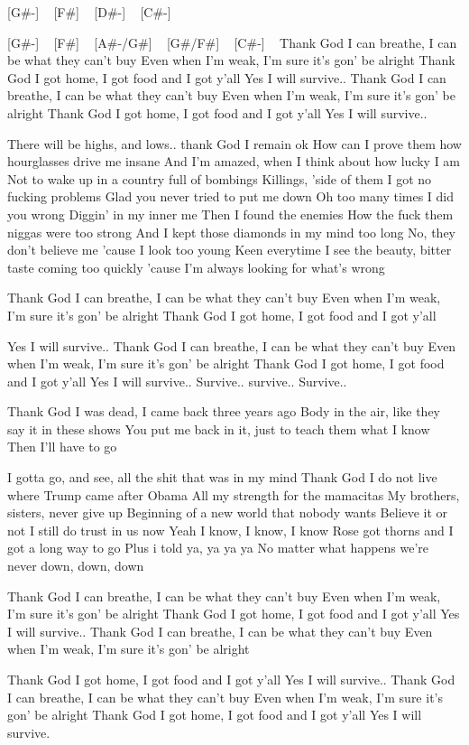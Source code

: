 

[G#-] ~ [F#] ~ [D#-] ~ [C#-] ~

[G#-] ~ [F#] ~ [A#-/G#]  ~ [G#/F#] ~ [C#-] ~
Thank God I can breathe, I can be what they can't buy
Even when I'm weak, I'm sure it's gon' be alright
Thank God I got home, I got food and I got y'all
Yes I will survive..
Thank God I can breathe, I can be what they can't buy
Even when I'm weak, I'm sure it's gon' be alright
Thank God I got home, I got food and I got y'all
Yes I will survive..

There will be highs, and lows.. thank God I remain ok
How can I prove them how hourglasses drive me insane
And I'm amazed, when I think about how lucky I am
Not to wake up in a country full of bombings
Killings, 'side of them I got no fucking problems
Glad you never tried to put me down
Oh too many times I did you wrong
Diggin' in my inner me
Then I found the enemies
How the fuck them niggas were too strong
And I kept those diamonds in my mind too long
No, they don't believe me 'cause I look too young
Keen everytime I see the beauty, bitter taste coming too quickly 'cause
I'm always looking for what's wrong

Thank God I can breathe, I can be what they can't buy
Even when I'm weak, I'm sure it's gon' be alright
Thank God I got home, I got food and I got y'all

Yes I will survive..
Thank God I can breathe, I can be what they can't buy
Even when I'm weak, I'm sure it's gon' be alright
Thank God I got home, I got food and I got y'all
Yes I will survive..
Survive.. survive..
Survive..

Thank God I was dead, I came back three years ago
Body in the air, like they say it in these shows
You put me back in it, just to teach them what I know
Then I'll have to go

I gotta go, and see, all the shit that was in my mind
Thank God I do not live where Trump came after Obama
All my strength for the mamacitas
My brothers, sisters, never give up
Beginning of a new world that nobody wants
Believe it or not I still do trust in us now
Yeah I know, I know, I know
Rose got thorns and I got a long way to go
Plus i told ya, ya ya ya
No matter what happens we're never down, down, down

Thank God I can breathe, I can be what they can't buy
Even when I'm weak, I'm sure it's gon' be alright
Thank God I got home, I got food and I got y'all
Yes I will survive..
Thank God I can breathe, I can be what they can't buy
Even when I'm weak, I'm sure it's gon' be alright

Thank God I got home, I got food and I got y'all
Yes I will survive..
Thank God I can breathe, I can be what they can't buy
Even when I'm weak, I'm sure it's gon' be alright
Thank God I got home, I got food and I got y'all
Yes I will survive.